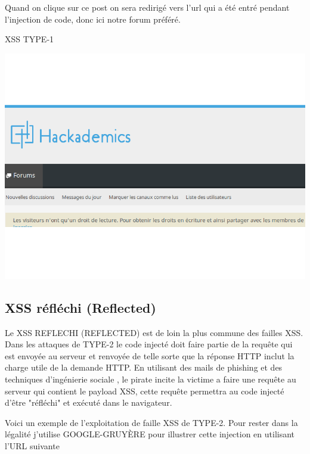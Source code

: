 \begin{itemize}
\bigskip

\begin{flushleft}
Quand on clique sur ce post on sera redirigé vers l’url qui a été entré pendant l’injection de code, donc ici notre forum préféré.
\end{flushleft}

\begin{center}
\caption{XSS TYPE-1}
\includegraphics[scale=0.3]{Web/assets/xssha.png}
\end{center}

\bigskip

\subsection{XSS réfléchi (Reflected)}\label{vulnerabilites:web:xss:reflected}

Le XSS REFLECHI (REFLECTED) est de loin la plus commune des failles XSS. Dans les attaques de TYPE-2 le code injecté doit faire partie de la requête qui est envoyée au serveur et renvoyée de telle sorte que la réponse HTTP inclut la charge utile de la demande HTTP. En utilisant des mails de phishing  et des techniques d'ingénierie sociale , le pirate incite la victime a faire une requête au serveur qui contient le payload XSS, cette requête permettra au code injecté d'être "réfléchi" et exécuté dans le navigateur.

\begin{flushleft}
Voici un exemple de l'exploitation de faille XSS de TYPE-2. Pour rester dans la légalité j'utilise GOOGLE-GRUYÈRE pour illustrer cette injection en utilisant l'URL suivante 
\end{flushleft}


\end{itemize}
